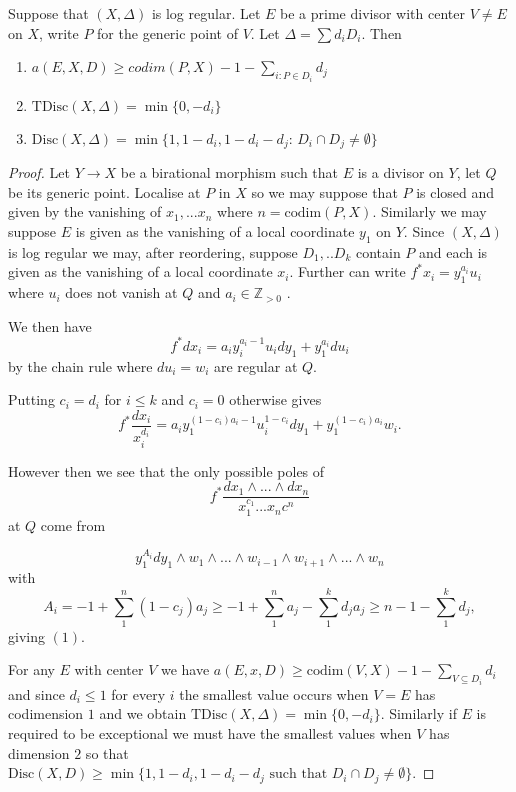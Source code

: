 \documentclass[a4paper,12pt]{book}
\begin{document}
\begin{lemma}
	Suppose that $(X,\Delta)$ is log regular. Let $E$ be a prime divisor with center $V\neq E$ on $X$, write $P$ for the generic point of $V$. Let $\Delta= \sum d_{i}D_{i}$.
	Then \begin{enumerate}
		\item $a(E,X,D)\geq codim(P,X) -1-\sum_{i: P\in D_{i}}d_{j}$
		\item $\text{TDisc}(X,\Delta)=\min\{0,-d_{i}\}$
		\item $\text{Disc}(X,\Delta) =\min\{1,1-d_{i},1-d_{i}-d_{j}\text{: } D_{i} \cap D_{j}\neq \emptyset\}$

	\end{enumerate}
\end{lemma}
\begin{proof}
	Let $Y \to X$ be a birational morphism such that $E$ is a divisor on $Y$, let $Q$ be its generic point. Localise at $P$ in $X$ so we may suppose that $P$ is closed and given by the vanishing of $x_{1},...x_{n}$ where $n=\text{codim}(P,X)$. Similarly we may suppose $E$ is given as the vanishing of a local coordinate $y_{1}$ on $Y$. Since $(X,\Delta)$ is log regular we may, after reordering, suppose $D_{1},..D_{k}$ contain $P$ and each is given as the vanishing of a local coordinate $x_{i}$. Further can write $f^{*}x_{i}=y_{1}^{a_{i}}u_{i}$ where $u_{i}$ does not vanish at $Q$ and $a_{i}\in \mathbb{Z}_{>0}$ .
	
	We then have $$f^{*}dx_{i}=a_{i}y_{i}^{a_{i}-1}u_{i}dy_{1} + y_{1}^{a_{i}}du_{i}$$ by the chain rule where $du_{i}=w_{i}$ are regular at $Q$.
	
	Putting $c_{i}=d_{i}$ for $i \leq k$ and $c_{i}=0$ otherwise gives
	$$f^{*}\frac{dx_{i}}{x_{i}^{d_{i}}}=a_{i}y_{1}^{(1-c_{i})a_{i}-1}u_{i}^{1-c_{i}}dy_{1} +y_{1}^{(1-c_{i})a_{i}}w_{i}.$$
	
	However then we see that the only possible poles of 
	$$f^{*}\frac{dx_{1}\wedge...\wedge dx_{n}}{x_{1}^{c_{1}}...x_{n}c^{n}}$$
	at $Q$ come from 
	
	$$y_{1}^{A_{i}}dy_{1}\wedge w_{1}\wedge ... \wedge w_{i-1} \wedge w_{i+1} \wedge... \wedge w_{n}$$
	with $$A_{i}=-1+ \sum_{1}^{n} (1-c_{j})a_{j} \geq -1+\sum _{1}^{n}a_{j} -\sum_{1}^{k} d_{j}a_{j} \geq n -1 - \sum_{1}^{k} d_{j},$$ giving $(1)$.
	
	For any $E$ with center $V$ we have $a(E,x,D) \geq \text{codim}(V,X) -1 - \sum_{V \subseteq D_{i}} d_{i}$ and since $d_{i} \leq 1$ for every $i$ the smallest value occurs when $V=E$ has codimension $1$ and we obtain $\text{TDisc}(X,\Delta)=\min\{0,-d_{i}\}$. Similarly if $E$ is required to be exceptional we must have the smallest values when $V$ has dimension $2$ so that $\text{Disc}(X,D)\geq \min\{1,1-d_{i},1-d_{i}-d_{j} \text{ such that }D_{i}\cap D_{j} \neq \emptyset\}$.
	

\end{proof}
\end{document}
